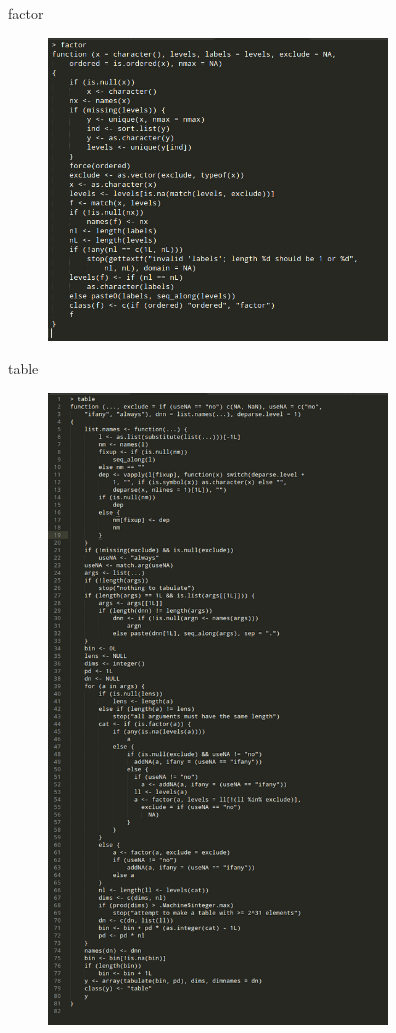 \documentclass{beamer}\usepackage[]{graphicx}\usepackage[]{color}
\begin{document}
\begin{frame}[fragile]{factor}
\begin{figure}[ht!]
\centering
\includegraphics[width=90mm]{pictures/factor.jpg}
\label{overflow}
\end{figure}
\end{frame}


\begin{frame}[fragile]{table}
\begin{figure}[ht!]
\centering
\includegraphics[width=90mm]{pictures/table.jpg}
\label{overflow}
\end{figure}
\end{frame}
\end{document}
